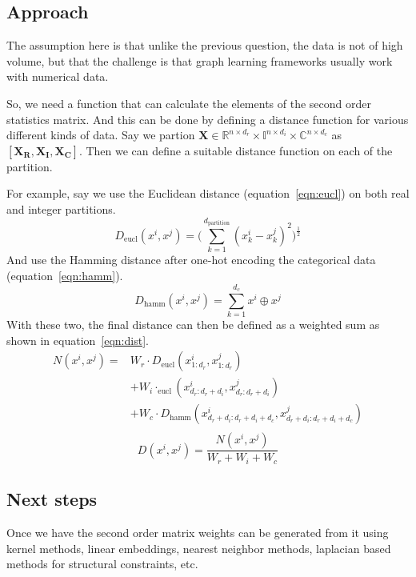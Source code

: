 \documentclass[11pt]{article}
\begin{document}
\subsection{Approach}
\label{sec:org1c60d9b}
The assumption here is that unlike the previous question, the data is
not of high volume, but that the challenge is that graph learning
frameworks usually work with numerical data.\par
So, we need a function that can calculate the elements of the second
order statistics matrix. And this can be done by defining a distance
function for various different kinds of data. Say we partion
\(\mathbf{X}\in\mathbb{R}^{n\times d_r}\times \mathbb{I}^{n\times d_i}
\times\mathbb{C}^{n\times d_c}\) as
\([\mathbf{X_R},\mathbf{X_I},\mathbf{X_C}]\). Then we can define a
suitable distance function on each of the partition.\par
For example, say we use the Euclidean distance (equation~\ref{eqn:eucl}) on both real and
integer partitions.
\begin{equation}
D_{\text{eucl}}(x^i,x^j) = \biggl(\sum_{k=1}^{d_{\text{partition}}}(x^i_k-x^j_k)^2\biggr)^{\frac{1}{2}}
\label{eqn:eucl}
\end{equation}
And use the Hamming distance after one-hot encoding the categorical
data (equation~\ref{eqn:hamm}).
\begin{equation}
D_{\text{hamm}}(x^i,x^j)=\sum_{k=1}^{d_c} x^i\oplus x^j
\label{eqn:hamm}
\end{equation}
With these two, the final distance can then be defined as a weighted
sum as shown in equation~\ref{eqn:dist}.
\begin{align*}
N(x^i, x^j)=&W_r\cdot D_{\text{eucl}}(x^i_{1:d_r},x^j_{1:d_r})\\
&+W_i\cdot _{\text{eucl}}(x^i_{d_r:d_r+d_i},x^j_{d_r:d_r+d_i})\\
&+W_c\cdot D_{\text{hamm}}(x^i_{d_r+d_i:d_r+d_i+d_c},x^j_{d_r+d_i:d_r+d_i+d_c})\\
\end{align*}
\begin{equation}
D(x^i,x^j)=\frac{N(x^i,x^j)}{W_r+W_i+W_c}
\label{eqn:dist}
\end{equation}
\subsection{Next steps}
\label{sec:org34c02f3}
Once we have the second order matrix weights can be generated from it
using kernel methods, linear embeddings, nearest neighbor methods,
laplacian based methods for structural constraints, etc.
\end{document}
